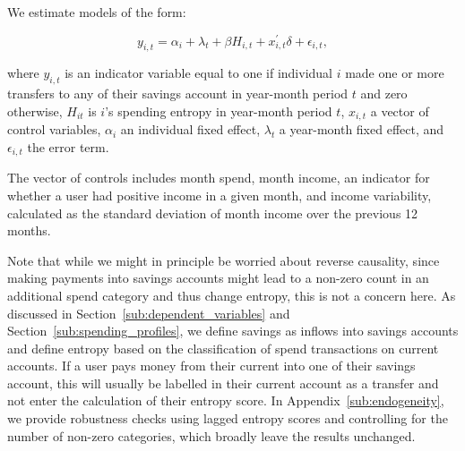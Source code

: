 We estimate models of the form: 

\begin{equation}
    y_{i,t} = \alpha_i + \lambda_t + \beta H_{i,t} + x^\prime_{i,t} \delta +
    \epsilon_{i,t},
\end{equation}

\noindent where $y_{i,t}$ is an indicator variable equal to one if individual $i$ made
one or more transfers to any of their savings account in year-month period $t$ and zero
otherwise, $H_{it}$ is $i$'s spending entropy in year-month period $t$, $x_{i,t}$ a vector
of control variables, $\alpha_i$ an individual fixed effect, $\lambda_t$ a
year-month fixed effect, and $\epsilon_{i, t}$ the error term.

The vector of controls includes month spend, month income, an indicator for
whether a user had positive income in a given month, and income
variability, calculated as the standard deviation of month income over the
previous 12 months.

Note that while we might in principle be worried about reverse causality, since
making payments into savings accounts might lead to a non-zero count in an
additional spend category and thus change entropy, this is not a concern here.
As discussed in Section~\ref{sub:dependent_variables} and
Section~\ref{sub:spending_profiles}, we define savings as inflows into savings
accounts and define entropy based on the classification of spend transactions
on current accounts. If a user pays money from their current into one of their
savings account, this will usually be labelled in their current account as a
transfer and not enter the calculation of their entropy score. In
Appendix~\ref{sub:endogeneity}, we provide robustness checks using lagged
entropy scores and controlling for the number of non-zero categories, which
broadly leave the results unchanged.

